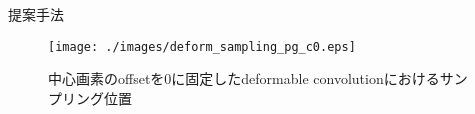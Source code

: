\begin{chapter}{提案手法}

\begin{figure}[H]
  \centering
  \texttt{[image: ./images/deform\_sampling\_pg\_c0.eps]}
  \caption{中心画素のoffsetを0に固定したdeformable convolutionにおけるサンプリング位置}
  \label{fig:defconv_c0_offset}
\end{figure}

\end{chapter}
